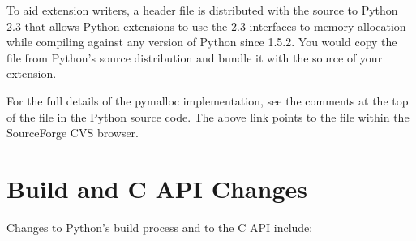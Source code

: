 \documentclass{howto}
\begin{document}
To aid extension writers, a header file  is
distributed with the source to Python 2.3 that allows Python
extensions to use the 2.3 interfaces to memory allocation while
compiling against any version of Python since 1.5.2.  You would copy
the file from Python's source distribution and bundle it with the
source of your extension.

\begin{seealso}

{For the full details of the pymalloc implementation, see
the comments at the top of the file  in the
Python source code.  The above link points to the file within the
SourceForge CVS browser.}

\end{seealso}


\section{Build and C API Changes}

Changes to Python's build process and to the C API include:
\end{document}
